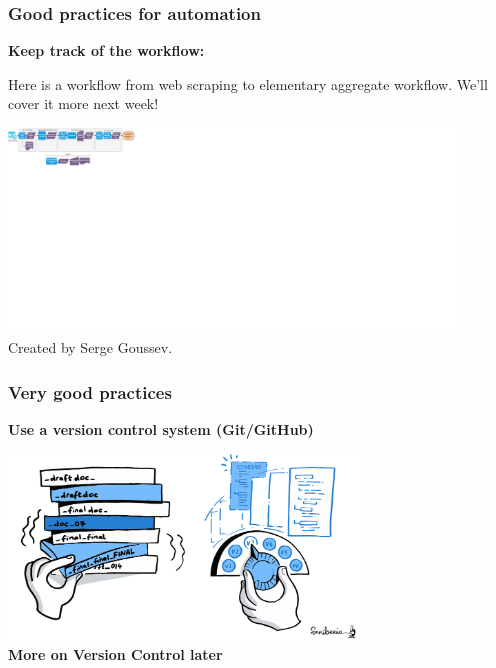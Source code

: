 \documentclass[xcolor=x11names,compress]{beamer}
\renewcommand{\(}{\begin{columns}}
\renewcommand{\)}{\end{columns}}
\newcommand{\<}[1]{\begin{column}{#1}}
\renewcommand{\>}{\end{column}}
\begin{document}
\begin{frame}
\frametitle{\textbf{Good practices for  automation} }
\textcolor{siap}{\textbf{Keep track of the workflow:} \\  }

Here is a workflow from web scraping to elementary aggregate workflow. We'll cover it more next week!\\
\begin{center}
\href{https://github.com/sergegoussev/ESCAP_RAP_class/blob/main/docs/images/ads-process-overview-high-level-overview.drawio.svg}
{\includegraphics[width=0.9\textwidth]{ESCAPWebScrappingPipeline.png}} \\
\hfill \tiny{ \textcolor{gris}{Created by Serge Goussev.}}
\end{center}

\end{frame}

\begin{frame}
\frametitle{\textbf{Very good practices} }
\textcolor{siap}{\textbf{Use a version control system  (Git/GitHub)}} \\
\vspace{0.5cm}
\begin{center}
 \includegraphics[width=0.7\textwidth]{FileHistory.PNG} \\

\large{\textbf{ More on Version Control later }}

\end{center}
\end{frame}
\end{document}
